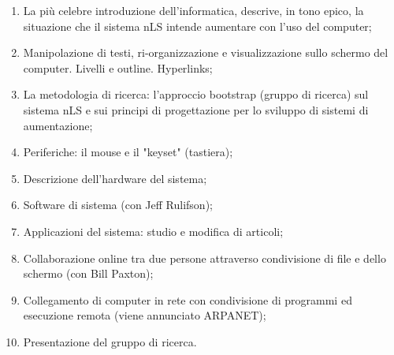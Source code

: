 \begin{enumerate}
    \item La più celebre introduzione dell'informatica, descrive, in tono epico,
    la situazione che il sistema nLS intende aumentare con l'uso del computer;
    \item Manipolazione di testi, ri-organizzazione e visualizzazione sullo schermo del 
    computer. Livelli e outline. Hyperlinks;
    \item La metodologia di ricerca: l'approccio bootstrap (gruppo di ricerca) sul sistema nLS
    e sui principi di progettazione per lo sviluppo di sistemi di aumentazione;
    \item Periferiche: il mouse e il "keyset" (tastiera);
    \item Descrizione dell'hardware del sistema;
    \item Software di sistema (con Jeff Rulifson);
    \item Applicazioni del sistema: studio e modifica di articoli;
    \item Collaborazione online tra due persone attraverso condivisione di file e dello schermo (con Bill Paxton);
    \item Collegamento di computer in rete con condivisione di programmi ed esecuzione remota (viene annunciato ARPANET);
    \item Presentazione del gruppo di ricerca.
\end{enumerate}


